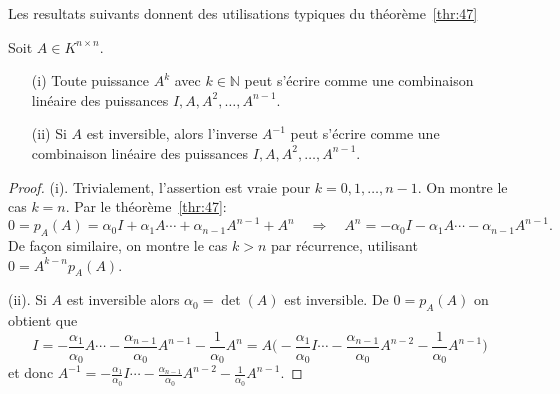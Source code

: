 Les resultats suivants donnent des utilisations typiques du théorème~\ref{thr:47}
\begin{corollary} Soit $A \in K^{n ×n}$.
\begin{enumerate}
\item[(i)] Toute puissance $A^k$ avec $k∈ℕ$ peut s'\'ecrire comme une combinaison lin\'eaire des puissances $I,A,A^2,\ldots,A^{n-1}$.
\item[(ii)] Si $A$ est inversible, alors l'inverse $A^{-1}$ peut s'\'ecrire comme une combinaison lin\'eaire des puissances $I,A,A^2,\ldots,A^{n-1}$.
\end{enumerate}
\end{corollary}

\begin{proof}
 (i). Trivialement, l'assertion est vraie pour $k = 0,1,\ldots,n-1$.
On montre le cas $k = n$. Par le théorème~\ref{thr:47}:
\[
 0 = p_A(A) = \alpha_0 I + \alpha_1 A  \cdots + \alpha_{n-1} A^{n-1} + A^n \quad
\Rightarrow \quad A^n = 
-\alpha_0 I - \alpha_1 A  \cdots - \alpha_{n-1} A^{n-1}.
\]
De fa\c{c}on similaire, on montre le cas $k>n$ par r\'ecurrence, utilisant $0 = A^{k-n} p_A(A)$.

(ii). Si $A$ est inversible alors $\alpha_0 = \det(A)$ est inversible. De $0 = p_A(A)$ on obtient que
\[
  I = -\frac{\alpha_1}{\alpha_0} A  \cdots -\frac{\alpha_{n-1}}{\alpha_0}
A^{n-1} -\frac{1}{\alpha_0} A^n = A \Big( -\frac{\alpha_1}{\alpha_0} I  \cdots
-\frac{\alpha_{n-1}}{\alpha_0} A^{n-2} -\frac{1}{\alpha_0} A^{n-1} \Big)
\]
et donc $A^{-1} = -\frac{\alpha_1}{\alpha_0} I  \cdots
-\frac{\alpha_{n-1}}{\alpha_0} A^{n-2} -\frac{1}{\alpha_0} A^{n-1}$.
\end{proof}



